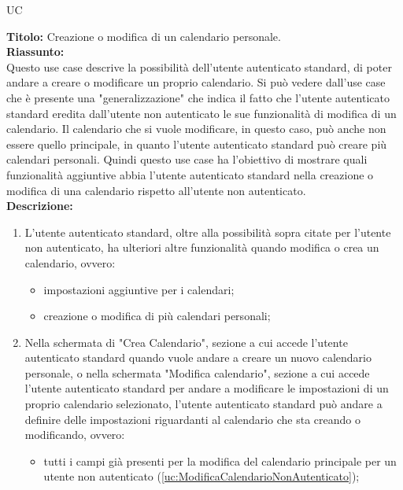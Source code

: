 \begin{listaPersonale}{UC}
\begin{listaPersonale2}[UC] {}
            \textbf{Titolo: } Creazione o modifica di un calendario personale. \\
            \textbf{Riassunto: } \\  Questo use case descrive la possibilità dell'utente autenticato standard, di poter andare a creare o modificare un proprio calendario. Si può vedere dall'use case che è presente una "generalizzazione" che indica il fatto che l'utente autenticato standard eredita dall'utente non autenticato le sue funzionalità di modifica di un calendario. Il calendario che si vuole modificare, in questo caso, può anche non essere quello principale, in quanto l'utente autenticato standard può creare più calendari personali. Quindi questo use case ha l'obiettivo di mostrare quali funzionalità aggiuntive abbia l'utente autenticato standard nella creazione o modifica di una calendario rispetto all'utente non autenticato. \\
            \textbf{Descrizione: }
            \begin{enumerate}
                \item L'utente autenticato standard, oltre alla possibilità sopra citate per l'utente non autenticato, ha ulteriori altre funzionalità quando modifica o crea un calendario, ovvero:
                      \begin{itemize}
                          \item impostazioni aggiuntive per i calendari;
                          \item creazione o modifica di più calendari personali;
                      \end{itemize}
                \item Nella schermata di "Crea Calendario", sezione a cui accede l'utente autenticato standard quando vuole andare a creare un nuovo calendario personale, o nella schermata "Modifica calendario", sezione a cui accede l'utente autenticato standard per andare a modificare le impostazioni di un proprio calendario selezionato, l'utente autenticato standard può andare a definire delle impostazioni riguardanti al calendario che sta creando o modificando, ovvero:
                      \begin{itemize}
                          \item tutti i campi già presenti per la modifica del calendario principale per un utente non autenticato (\ref{uc:ModificaCalendarioNonAutenticato});

\end{itemize}
\end{enumerate}
\end{listaPersonale2}
\end{listaPersonale}

